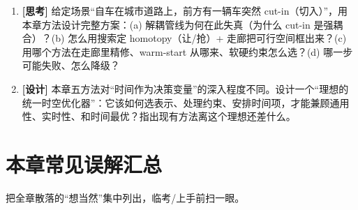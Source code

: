 \begin{practice}
\begin{enumerate}
  \item \textbf{[思考]} 给定场景“自车在城市道路上，前方有一辆车突然 cut-in（切入）”，用本章方法设计完整方案：(a) 解耦管线为何在此失真（为什么 cut-in 是强耦合）？(b) 怎么用搜索定 homotopy（让/抢）+ 走廊把可行空间框出来？(c) 用哪个方法在走廊里精修、warm-start 从哪来、软硬约束怎么选？(d) 哪一步可能失败、怎么降级？
  \item \textbf{[设计]} 本章五方法对“时间作为决策变量”的深入程度不同。设计一个“理想的统一时空优化器”：它该如何选表示、处理约束、安排时间项，才能兼顾通用性、实时性、和时间最优？指出现有方法离这个理想还差什么。
\end{enumerate}
\end{practice}

\section*{本章常见误解汇总}
把全章散落的“想当然”集中列出，临考/上手前扫一眼。

